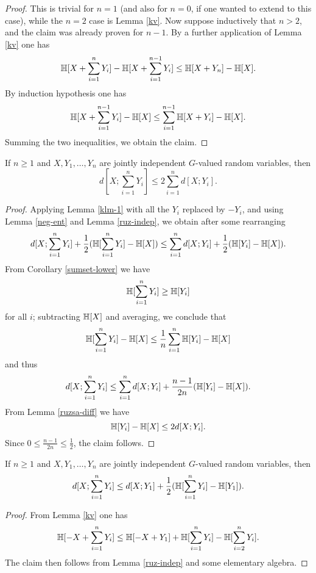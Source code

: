 \begin{proof}  This is trivial for $n=1$ (and also for $n=0$, if one wanted to extend to this case), while the $n=2$ case is Lemma \ref{kv}.  Now suppose inductively that $n > 2$, and the claim was already proven for $n-1$.  By a further application of Lemma \ref{kv} one has
$$  \mathbb{H}[X + \sum_{i=1}^n Y_i] -  \mathbb{H}[X + \sum_{i=1}^{n-1} Y_i] \leq \mathbb{H}[X+Y_n] - \mathbb{H}[X].$$
By induction hypothesis one has
$$ \mathbb{H}[X + \sum_{i=1}^{n-1} Y_i] - \mathbb{H}[X] \leq \sum_{i=1}^{n-1} \mathbb{H}[X+Y_i] - \mathbb{H}[X].$$
Summing the two inequalities, we obtain the claim.
\end{proof}

\begin{lemma}\label{klm-2}  If $n \geq 1$ and $X, Y_1, \dots, Y_n$ are jointly independent $G$-valued random variables, then
  $$ d[X; \sum_{i=1}^n Y_i] \leq 2 \sum_{i=1}^n d[X; Y_i].$$
\end{lemma}

\begin{proof}
  Applying Lemma \ref{klm-1} with all the $Y_i$ replaced by $-Y_i$, and using Lemma \ref{neg-ent} and Lemma \ref{ruz-indep}, we obtain after some rearranging
$$ d[X; \sum_{i=1}^n Y_i] + \frac{1}{2} (\mathbb{H}[\sum_{i=1}^n Y_i] - \mathbb{H}[X]) \leq \sum_{i=1}^n d[X;Y_i] + \frac{1}{2} (\mathbb{H}[Y_i] - \mathbb{H}[X]).$$
From Corollary \ref{sumset-lower} we have
$$ \mathbb{H}[\sum_{i=1}^n Y_i] \geq \mathbb{H}[Y_i]$$
for all $i$; subtracting $\mathbb{H}[X]$ and averaging, we conclude that
$$ \mathbb{H}[\sum_{i=1}^n Y_i] - \mathbb{H}[X] \leq \frac{1}{n} \sum_{i=1}^n \mathbb{H}[Y_i] - \mathbb{H}[X]$$
and thus
$$ d[X; \sum_{i=1}^n Y_i] \leq \sum_{i=1}^n d[X;Y_i] + \frac{n-1}{2n} (\mathbb{H}[Y_i] - \mathbb{H}[X]).$$
From Lemma \ref{ruzsa-diff} we have
$$ \mathbb{H}[Y_i] - \mathbb{H}[X] \leq 2 d[X;Y_i].$$
Since $0 \leq \frac{n-1}{2n} \leq \frac{1}{2}$, the claim follows.
\end{proof}

\begin{lemma}\label{klm-3}  If $n \geq 1$ and $X, Y_1, \dots, Y_n$ are jointly independent $G$-valued random variables, then
  $$ d[X; \sum_{i=1}^n Y_i] \leq d[X; Y_1] + \frac{1}{2}(\mathbb{H}[ \sum_{i=1}^n Y_i ] - \mathbb{H}[Y_1]).$$
\end{lemma}

\begin{proof}
  From Lemma \ref{kv} one has
  $$ \mathbb{H}[ -X + \sum_{i=1}^n Y_i ] \leq \mathbb{H}[ - X + Y_1 ] + \mathbb{H}[ \sum_{i=1}^n Y_i ] - \mathbb{H}[ \sum_{i=2}^n Y_i ].$$
  The claim then follows from Lemma \ref{ruz-indep} and some elementary algebra.
\end{proof}

